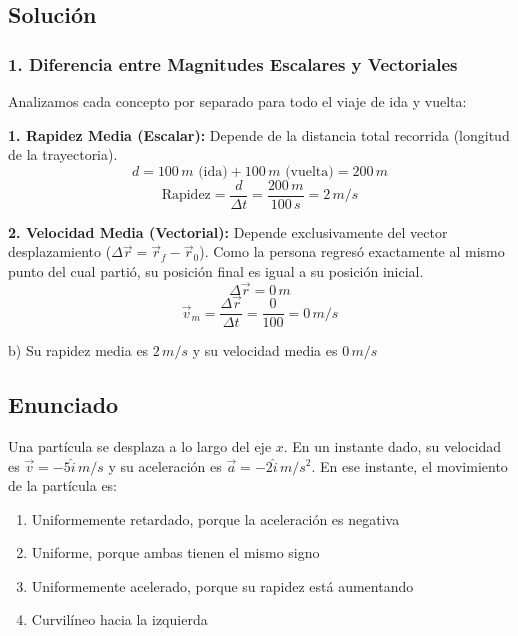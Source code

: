 \documentclass[12pt, a4paper]{article}
\begin{document}
\subsection*{Solución}

\subsubsection*{1. Diferencia entre Magnitudes Escalares y Vectoriales}
Analizamos cada concepto por separado para todo el viaje de ida y vuelta:

\textbf{1. Rapidez Media (Escalar):}
Depende de la distancia total recorrida (longitud de la trayectoria).
$$ d = 100\,\si{m} \text{ (ida)} + 100\,\si{m} \text{ (vuelta)} = 200\,\si{m} $$
$$ \text{Rapidez} = \frac{d}{\Delta t} = \frac{200\,\si{m}}{100\,\si{s}} = 2\,\si{m/s} $$

\textbf{2. Velocidad Media (Vectorial):}
Depende exclusivamente del vector desplazamiento ($\Delta \vec{r} = \vec{r}_f - \vec{r}_0$).
Como la persona regresó exactamente al mismo punto del cual partió, su posición final es igual a su posición inicial.
$$ \Delta \vec{r} = 0\,\si{m} $$
$$ \vec{v}_m = \frac{\Delta \vec{r}}{\Delta t} = \frac{0}{100} = 0\,\si{m/s} $$

\begin{tcolorbox}[colback=green!5!white, colframe=green!50!black, title=Respuesta Final]
\centering \Large b) Su rapidez media es $2\,\si{m/s}$ y su velocidad media es $0\,\si{m/s}$
\end{tcolorbox}

\newpage

\subsection*{Enunciado}
Una partícula se desplaza a lo largo del eje $x$. En un instante dado, su velocidad es $\vec{v} = -5\hat{i}\,\si{m/s}$ y su aceleración es $\vec{a} = -2\hat{i}\,\si{m/s^2}$. En ese instante, el movimiento de la partícula es:
\begin{enumerate}[label=\alph*)]
    \item Uniformemente retardado, porque la aceleración es negativa
    \item Uniforme, porque ambas tienen el mismo signo
    \item Uniformemente acelerado, porque su rapidez está aumentando
    \item Curvilíneo hacia la izquierda
\end{enumerate}
\end{document}
